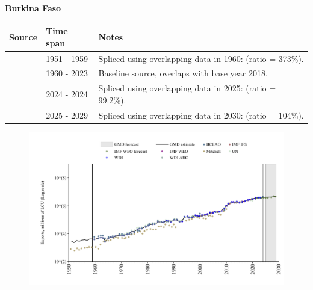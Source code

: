 \documentclass[12pt,a4paper,landscape]{article}
\begin{document}
\begin{adjustbox}{max totalsize={\paperwidth}{\paperheight},center}
\begin{minipage}[t][\textheight][t]{\textwidth}
\vspace*{0.5cm}
{}
\begin{center}
{\Large\bfseries Burkina Faso}
\end{center}
\vspace{0.5cm}
\begin{table}[H]
\centering
\small
\begin{tabular}{|l|l|l|}
\hline
\textbf{Source} & \textbf{Time span} & \textbf{Notes} \\
\hline
\rowcolor{white}\cite{Mitchell}& 1951 - 1959 &Spliced using overlapping data in 1960: (ratio = 373\%).\\
\rowcolor{lightgray}\cite{WDI}& 1960 - 2023 &Baseline source, overlaps with base year 2018.\\
\rowcolor{white}\cite{BCEAO}& 2024 - 2024 &Spliced using overlapping data in 2025: (ratio = 99.2\%).\\
\rowcolor{lightgray}\cite{IMF_WEO_forecast}& 2025 - 2029 &Spliced using overlapping data in 2030: (ratio = 104\%).\\
\hline
\end{tabular}
\end{table}
\begin{figure}[H]
\centering
\includegraphics[width=\textwidth,height=0.6\textheight,keepaspectratio]{graphs/BFA_exports.pdf}
\end{figure}
\end{minipage}
\end{adjustbox}
\end{document}

